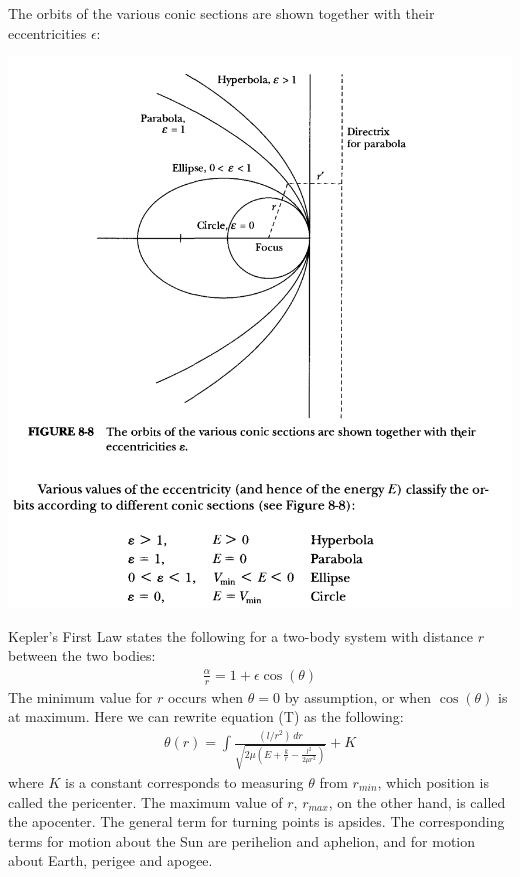 \documentclass[11pt,oneside]{book}
\theoremstyle{break}
\theoremstyle{break}
\begin{document}
The orbits of the various conic sections are shown together with their eccentricities $\epsilon$:
\begin{center}
\includegraphics[scale=0.65]{epsilon.png}
\end{center}
\newpage
Kepler's First Law states the following for a two-body system with distance $r$ between the two bodies:
\begin{align*}
\frac{\alpha}{r} = 1+\epsilon \cos(\theta)
\end{align*}
The minimum value for $r$ occurs when $\theta = 0$ by assumption, or when $\cos(\theta)$ is at maximum. Here we can rewrite equation (T) as the following:
\begin{align*}
\theta(r) =  \int\frac{(l / r^2 )\, dr}{\sqrt{ 2\mu \left( E + \frac{k}{r} - \frac{l^2}{2\mu r^2} \right)}} + K
\end{align*}
where $K$ is a constant corresponds to measuring $\theta$ from $r_{min}$, which position is called the pericenter. The maximum value of $r$, $r_{max}$, on the other hand, is called the apocenter. The general term for turning points is apsides. The corresponding terms for motion about the Sun are perihelion and aphelion, and for motion about Earth, perigee and apogee. \\
\end{document}
